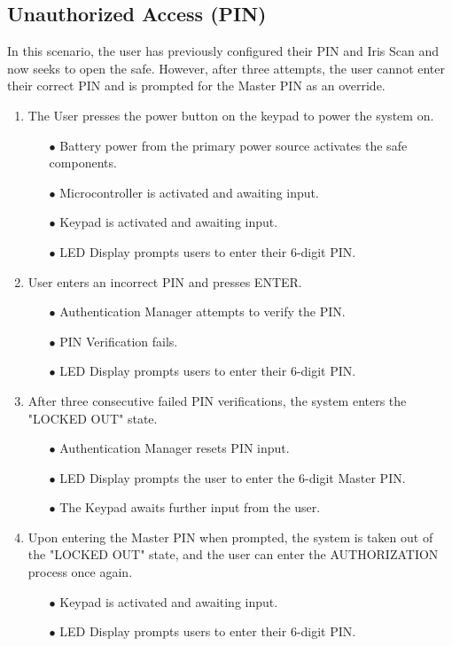 \documentclass{article}
\begin{document}
\subsection{Unauthorized Access (PIN)}
In this scenario, the user has previously configured their PIN and Iris Scan and now seeks to open the safe. However, after three attempts, the user cannot enter their correct PIN and is prompted for the Master PIN as an override.

\begin{enumerate}
    \item The User presses the power button on the keypad to power the system on.
    \begin{enumerate}
        \item[$\bullet$] Battery power from the primary power source activates the safe components.
        \item[$\bullet$] Microcontroller is activated and awaiting input.
        \item[$\bullet$] Keypad is activated and awaiting input.
        \item[$\bullet$] LED Display prompts users to enter their 6-digit PIN.
    \end{enumerate}
    \item User enters an incorrect PIN and presses ENTER.
    \begin{enumerate}
        \item[$\bullet$] Authentication Manager attempts to verify the PIN.
        \item[$\bullet$] PIN Verification fails.
        \item[$\bullet$] LED Display prompts users to enter their 6-digit PIN.
    \end{enumerate}
     \item After three consecutive failed PIN verifications, the system enters the "LOCKED OUT" state.
    \begin{enumerate}
        \item[$\bullet$] Authentication Manager resets PIN input.
        \item[$\bullet$] LED Display prompts the user to enter the 6-digit Master PIN.
        \item[$\bullet$] The Keypad awaits further input from the user.
    \end{enumerate}
    \item Upon entering the Master PIN when prompted, the system is taken out of the "LOCKED OUT" state, and the user can enter the AUTHORIZATION process once again.
    \begin{enumerate}
        \item[$\bullet$] Keypad is activated and awaiting input.
        \item[$\bullet$] LED Display prompts users to enter their 6-digit PIN.
    \end{enumerate}
\end{enumerate}
\end{document}
